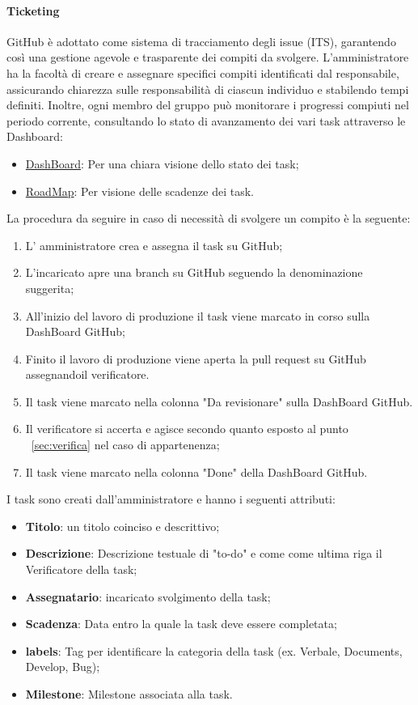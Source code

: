 \documentclass{article}
\begin{document}
\paragraph{Ticketing}
GitHub è adottato come sistema di tracciamento degli issue (ITS), garantendo così una gestione agevole e trasparente dei compiti da svolgere. L'amministratore ha la facoltà di creare e assegnare specifici compiti identificati dal responsabile, assicurando chiarezza sulle responsabilità di ciascun individuo e stabilendo tempi definiti. Inoltre, ogni membro del gruppo può monitorare i progressi compiuti nel periodo corrente, consultando lo stato di avanzamento dei vari task attraverso le Dashboard:
\begin{itemize}
    \item \href{https://github.com/orgs/ByteOps-swe/projects/1}{DashBoard}: Per una chiara visione dello stato dei task;
    \item \href{https://github.com/orgs/ByteOps-swe/projects/3}{RoadMap}: Per visione delle scadenze dei task.
\end{itemize}
La procedura da seguire in caso di necessità di svolgere un compito è la seguente:
\begin{enumerate}
    \item L' amministratore crea e assegna il task su GitHub;
    \item L'incaricato apre una branch su GitHub seguendo la denominazione suggerita;
    \item  All'inizio del lavoro di produzione il task viene marcato in corso sulla DashBoard GitHub;
    \item Finito il lavoro di produzione viene aperta la pull request su GitHub assegnandoil verificatore.
    \item Il task viene marcato nella colonna "Da revisionare" sulla DashBoard GitHub.
    \item Il verificatore si accerta e agisce secondo quanto esposto al punto ~\ref{sec:verifica} nel caso di appartenenza;
    \item Il task viene marcato nella colonna "Done" della DashBoard GitHub.
\end{enumerate}
I task sono creati dall'amministratore e hanno i seguenti attributi:
\begin{itemize}
    \item \textbf{Titolo}: un titolo coinciso e descrittivo;
    \item \textbf{Descrizione}: Descrizione testuale di "to-do" e come come ultima riga il Verificatore della task;
    \item \textbf{Assegnatario}: incaricato svolgimento della task;
    \item \textbf{Scadenza}: Data entro la quale la task deve essere completata;
    \item \textbf{labels}: Tag per identificare la categoria della task (ex. Verbale, Documents, Develop, Bug);
    \item \textbf{Milestone}: Milestone associata alla task.
\end{itemize}
\end{document}
